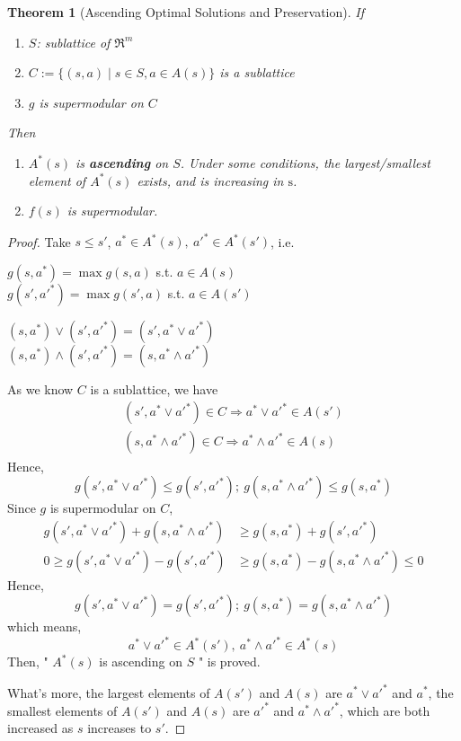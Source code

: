 \documentclass[11pt,a4paper]{article}
\newtheorem{theorem}{Theorem}
\begin{document}
\begin{theorem}[Ascending Optimal Solutions and Preservation]
    \quad

    If
    \begin{enumerate}
        \item $S$: sublattice of $\Re^{m}$
        \item $C:=\{(s, a) \mid s \in S, a \in A(s)\}$ is a sublattice
        \item $g$ is supermodular on $C$
    \end{enumerate}
    Then

    \begin{enumerate}
        \item $A^{*}(s)$ is \textbf{ascending} on $S$. Under some conditions, the largest/smallest element of $A^{*}(s)$ exists, and is increasing in $\mathrm{s}$.
        \item $f(s)$ is supermodular.
    \end{enumerate}
\end{theorem}

\begin{proof}
Take $s\leq s'$, $a^*\in A^*(s),\ {a'}^*\in A^*(s')$, i.e.
\begin{center}
    $g(s,a^*)=\max g(s,a)$ s.t. $a\in A(s)$\\
    $g(s',{a'}^*)=\max g(s',a)$ s.t. $a\in A(s')$
\end{center}
\begin{center}
    $(s,a^*)\vee(s',{a'}^*)=(s',a^*\vee{a'}^*)$\\
    $(s,a^*)\wedge(s',{a'}^*)=(s,a^*\wedge{a'}^*)$
\end{center}
As we know $C$ is a sublattice, we have
\begin{equation}
    \begin{aligned}
        (s',a^*\vee{a'}^*)\in C \Rightarrow	a^*\vee{a'}^*\in A(s')\\
        (s,a^*\wedge{a'}^*)\in C \Rightarrow	a^*\wedge{a'}^*\in A(s)
    \end{aligned}
    \nonumber
\end{equation}
Hence, $$g(s',a^*\vee{a'}^*)\leq g(s',{a'}^*);\ g(s,a^*\wedge{a'}^*)\leq g(s,a^*)$$
Since $g$ is supermodular on $C$,
\begin{equation}
    \begin{aligned}
        g(s',a^*\vee{a'}^*)+g(s,a^*\wedge{a'}^*)&\geq g(s,a^*)+g(s',{a'}^*)\\
        0\geq g(s',a^*\vee{a'}^*)-g(s',{a'}^*)&\geq g(s,a^*)-g(s,a^*\wedge{a'}^*)\leq 0
    \end{aligned}
    \nonumber
\end{equation}
Hence, $$g(s',a^*\vee{a'}^*)=g(s',{a'}^*);\ g(s,a^*)=g(s,a^*\wedge{a'}^*)$$
which means,
$$a^*\vee{a'}^*\in A^*(s'),\ a^*\wedge{a'}^*\in A^*(s)$$
Then, " $A^*(s)$ is ascending on $S$ " is proved.

What's more, the largest elements of $A(s')$ and $A(s)$ are $a^*\vee{a'}^*$ and $a^*$, the smallest elements of $A(s')$ and $A(s)$ are ${a'}^*$ and $a^*\wedge{a'}^*$, which are both increased as $s$ increases to $s'$.
\end{proof}
\end{document}
